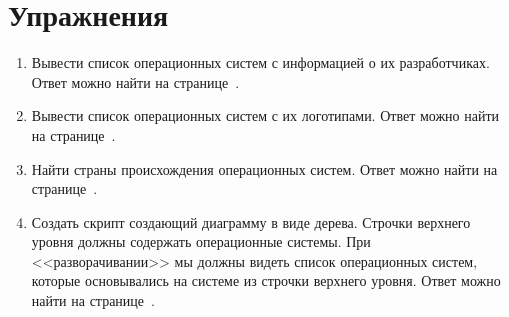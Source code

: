 \section{Упражнения}
\label{tasks:operating_system_tasks}
\begin{enumerate}
	\item Вывести список операционных систем с информацией о их разработчиках. Ответ можно найти на странице~\pageref{answer:os_and_developers}.
	\item Вывести список операционных систем с их логотипами. Ответ можно найти на странице~\pageref{answer:os_and_logos}.
	\item Найти страны происхождения операционных систем. Ответ можно найти на странице~\pageref{answer:os_country}.
	\item Создать скрипт создающий диаграмму в виде дерева. Строчки верхнего уровня должны содержать операционные системы. При <<разворачивании>> мы должны видеть список операционных систем, которые основывались на системе из строчки верхнего уровня. Ответ можно найти на странице~\pageref{answer:os_and_bases}.
\end{enumerate}